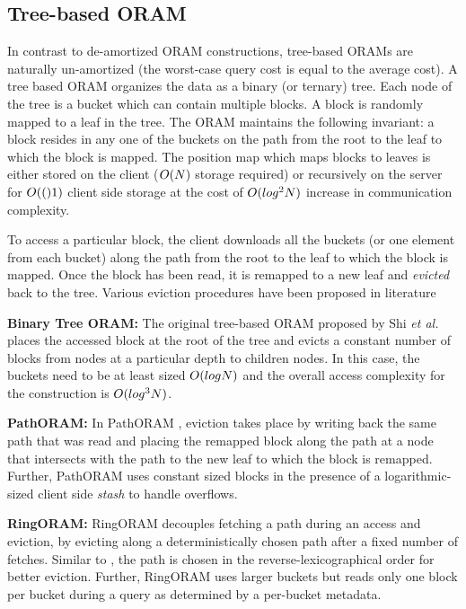 \subsection{Tree-based ORAM}
\label{oram:related:tree}
%
In contrast to de-amortized ORAM constructions, tree-based ORAMs are naturally un-amortized (the worst-case query cost is equal to the average cost). 
A tree based ORAM organizes the data as a binary (or ternary) tree. Each node of the tree is a bucket which can contain multiple blocks. 
A block is randomly mapped to a leaf in the tree. The ORAM maintains the following invariant: a block resides in any one of the buckets on the 
path from the root to the leaf to which the block is mapped. The position map which maps blocks to leaves is either stored on the client ($O(N)$ 
storage required) or recursively on the server for $O(()1)$ client side storage at the cost of $O(log^{2}N)$ increase in communication 
complexity.

To access a particular block, the client downloads all the buckets (or one element from each bucket) along the path from 
the root to the leaf to which the block is mapped. Once the block has been read, it is remapped to a new leaf and {\em evicted} 
back to the tree. Various eviction procedures have been proposed in literature \cite{circuitoram,pathoram,ringoram,binarytreeoram,clporam}

{\bf Binary Tree ORAM:} The original tree-based ORAM proposed by Shi {\em et al.} \cite{binarytreeoram} 
places the accessed block at the root of the tree and 
evicts a constant number of blocks from nodes at a particular depth to children nodes. In this case, the buckets need to be at least sized 
$O(logN)$ and the overall access complexity for the construction is $O(log^{3}N)$.

{\bf PathORAM:} In PathORAM \cite{pathoram}, eviction takes place by writing back the same path that was read and placing the remapped block 
along the path at a node that intersects with the path to the new leaf to which the block is remapped. Further, PathORAM \cite{pathoram} uses constant 
sized blocks in the presence of a logarithmic-sized client side {\em stash} to handle overflows.

{\bf RingORAM:} RingORAM decouples fetching a path during an access and eviction, by evicting along a deterministically chosen path after a fixed number of fetches. 
Similar to \cite{GentryORAM}, the path is chosen in the reverse-lexicographical order for better eviction. Further, RingORAM uses larger buckets but reads 
only one block per bucket during a query as determined by a per-bucket metadata.

